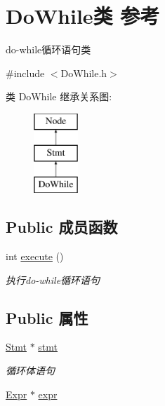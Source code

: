 \hypertarget{class_do_while}{}\section{Do\+While类 参考}
\label{class_do_while}


do-\/while循环语句类  




{\ttfamily \#include $<$Do\+While.\+h$>$}

类 Do\+While 继承关系图\+:\begin{figure}[H]
\begin{center}
\leavevmode
\includegraphics[height=3.000000cm]{class_do_while}
\end{center}
\end{figure}
\subsection*{Public 成员函数}
\begin{DoxyCompactItemize}
\item 
int \hyperlink{class_do_while_adb6934e033f44c6b52b1079faf1d84cf}{execute} ()\hypertarget{class_do_while_adb6934e033f44c6b52b1079faf1d84cf}{}\label{class_do_while_adb6934e033f44c6b52b1079faf1d84cf}

\begin{DoxyCompactList}\small\item\em 执行do-\/while循环语句 \end{DoxyCompactList}\end{DoxyCompactItemize}
\subsection*{Public 属性}
\begin{DoxyCompactItemize}
\item 
\hyperlink{class_stmt}{Stmt} $\ast$ \hyperlink{class_do_while_a0aee68f104ddceeb30a4e061cf315e0f}{stmt}\hypertarget{class_do_while_a0aee68f104ddceeb30a4e061cf315e0f}{}\label{class_do_while_a0aee68f104ddceeb30a4e061cf315e0f}

\begin{DoxyCompactList}\small\item\em 循环体语句 \end{DoxyCompactList}\item 
\hyperlink{class_expr}{Expr} $\ast$ \hyperlink{class_do_while_a55d5ffb9c6bee10f8375f028705e4901}{expr}
\end{DoxyCompactItemize}
